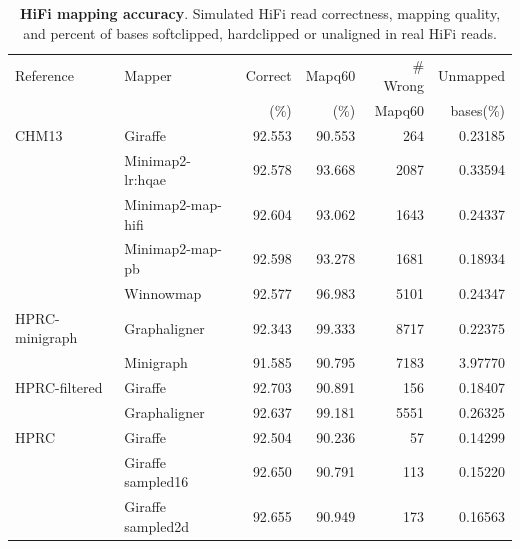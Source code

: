 \documentclass[11pt]{ucscthesis}
\begin{document}
\begin{landscape}
\begin{table}[htb]
    \centering
    \begin{tabular}{|l|l|r|r|r|r|}
    \hline
    Reference          & Mapper                 & Correct          & Mapq60          & \# Wrong            & Unmapped   \\
                       &                        & (\%)             & (\%)            & Mapq60              & bases(\%) \\
    \hline
    CHM13              & Giraffe                & 92.553           & 90.553          & 264                  & 0.23185   \\
                       & Minimap2-lr:hqae       & 92.578           & 93.668          & 2087                 & 0.33594  \\
                       & Minimap2-map-hifi      & 92.604           & 93.062          & 1643                 & 0.24337    \\
                       & Minimap2-map-pb        & 92.598           & 93.278          & 1681                 & 0.18934   \\
                       & Winnowmap              & 92.577           & 96.983          & 5101                 & 0.24347     \\
    HPRC-minigraph     & Graphaligner           & 92.343           & 99.333          & 8717                 & 0.22375     \\
                       & Minigraph              & 91.585           & 90.795          & 7183                 & 3.97770     \\
    HPRC-filtered      & Giraffe                & 92.703           & 90.891          & 156                  & 0.18407    \\
                       & Graphaligner           & 92.637           & 99.181           & 5551                & 0.26325    \\
    HPRC               & Giraffe                & 92.504           & 90.236          & 57                   & 0.14299  \\
                       & Giraffe sampled16      & 92.650           & 90.791          & 113                  & 0.15220      \\
                       & Giraffe sampled2d      & 92.655           & 90.949          & 173                  & 0.16563      \\
    \hline
    \end{tabular}
    \caption[HiFi mapping accuracy]{\textbf{HiFi mapping accuracy}. Simulated HiFi read correctness, mapping quality, and percent of bases softclipped, hardclipped or unaligned in real HiFi reads.}
    \label{tab:sup-hifi-sim}
\end{table}


\end{landscape}
\end{document}
